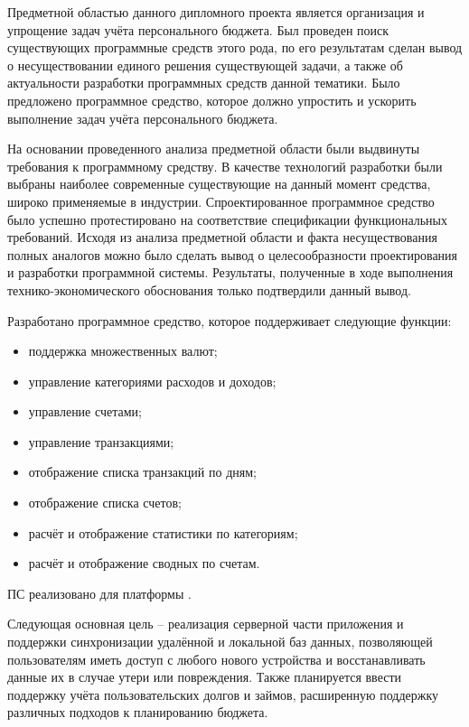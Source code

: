 
Предметной областью данного дипломного проекта является организация и упрощение задач учёта персонального бюджета.
Был проведен поиск существующих программные средств этого рода, по его результатам сделан вывод о несуществовании единого решения существующей задачи, а также об актуальности разработки программных средств данной тематики.
Было предложено программное средство, которое должно упростить и ускорить выполнение задач учёта персонального бюджета.

На основании проведенного анализа предметной области были выдвинуты требования к программному средству.
В качестве технологий разработки были выбраны наиболее современные существующие на данный момент средства, широко применяемые в индустрии.
Спроектированное программное средство было успешно протестировано на соответствие спецификации функциональных требований.
Исходя из анализа предметной области и факта несуществования полных аналогов можно было сделать вывод о целесообразности проектирования и разработки программной системы.
Результаты, полученные в ходе выполнения технико-экономического обоснования только подтвердили данный вывод.

Разработано программное средство, которое поддерживает следующие функции:
\begin{itemize}
    \item поддержка множественных валют;
    \item управление категориями расходов и доходов;
    \item управление счетами;
    \item управление транзакциями;
    \item отображение списка транзакций по дням;
    \item отображение списка счетов;
    \item расчёт и отображение статистики по категориям;
    \item расчёт и отображение сводных по счетам.
\end{itemize}

ПС реализовано для платформы \andro.

Следующая основная цель -- реализация серверной части приложения и поддержки синхронизации удалённой и локальной баз данных, позволяющей пользователям иметь доступ с любого нового устройства и восстанавливать данные их в случае утери или повреждения.
Также планируется ввести поддержку учёта пользовательских долгов и займов, расширенную поддержку различных подходов к планированию бюджета.